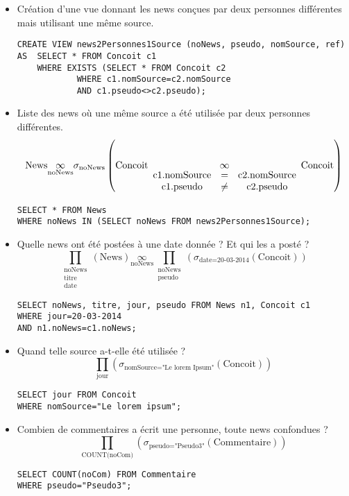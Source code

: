 \begin{itemize}
	\item Création d'une vue donnant les news conçues par deux personnes différentes mais utilisant une même source.
		\begin{verbatim}
CREATE VIEW news2Personnes1Source (noNews, pseudo, nomSource, ref)
AS	SELECT * FROM Concoit c1
	WHERE EXISTS (SELECT * FROM Concoit c2
			WHERE c1.nomSource=c2.nomSource
			AND c1.pseudo<>c2.pseudo);
		\end{verbatim}

	\item Liste des news où une même source a été utilisée par deux personnes différentes.
	\[\text{News}\underset{\text{noNews}}{\infty} \sigma_{\text{noNews}}\left(\text{Concoit} \underset{\begin{array}{c c c}\text{c1.nomSource}&=&\text{c2.nomSource}\\ \text{c1.pseudo}&\neq&\text{c2.pseudo}\end{array}}{\infty}\text{Concoit} \right)\]
	\begin{verbatim}
SELECT * FROM News
WHERE noNews IN (SELECT noNews FROM news2Personnes1Source);
	\end{verbatim}

	\item Quelle news ont été postées à une date donnée ? Et qui les a posté ?
	\[\prod_{\begin{array}{c}\text{noNews}\\ \text{titre}\\ \text{date}\end{array}}(\text{News})\underset{\text{noNews}}{\infty} \prod_{\begin{array}{c} \text{noNews}\\ \text{pseudo}\end{array}}\left( \sigma_{\text{date=20-03-2014}}(\text{Concoit})\right)\]
	\begin{verbatim}
SELECT noNews, titre, jour, pseudo FROM News n1, Concoit c1
WHERE jour=20-03-2014
AND n1.noNews=c1.noNews;
	\end{verbatim}

	\item Quand telle source a-t-elle été utilisée ?
	\[\prod_{\text{jour}}\left( \sigma_{\text{nomSource="Le lorem Ipsum"}} (\text{Concoit})\right)\]
	\begin{verbatim}
SELECT jour FROM Concoit
WHERE nomSource="Le lorem ipsum";
	\end{verbatim}
	
	\item Combien de commentaires a écrit une personne, toute news confondues ?
	\[\prod_{\text{COUNT(noCom)}}\left(\sigma_{\text{pseudo="Pseudo3"}}(\text{Commentaire})\right)\]
	\begin{verbatim}
SELECT COUNT(noCom) FROM Commentaire
WHERE pseudo="Pseudo3";
	\end{verbatim}


\end{itemize}
